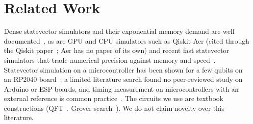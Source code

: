 \section{Related Work}
Dense statevector simulators and their exponential memory demand are well documented~\cite{haener2017}, as are GPU and CPU simulators such as Qiskit Aer (cited through the Qiskit paper~\cite{javadiabhari2024}; Aer has no paper of its own) and recent fast statevector simulators that trade numerical precision against memory and speed~\cite{yusufov2023}. Statevector simulation on a microcontroller has been shown for a few qubits on an RP2040 board~\cite{carney2023}; a limited literature search found no peer-reviewed study on Arduino or ESP boards, and timing measurement on microcontrollers with an external reference is common practice~\cite{TODO-mcu-timing}. The circuits we use are textbook constructions (QFT~\cite{coppersmith1994}, Grover search~\cite{grover1996}). We do not claim novelty over this literature.
